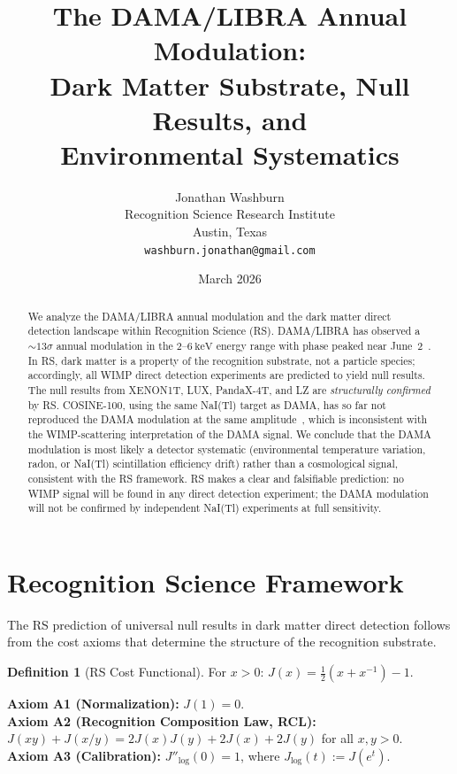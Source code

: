 \documentclass[12pt,a4paper]{article}
\title{The DAMA/LIBRA Annual Modulation:\\
Dark Matter Substrate, Null Results, and\\
Environmental Systematics}
\author{Jonathan Washburn\\
Recognition Science Research Institute\\
Austin, Texas\\
\texttt{washburn.jonathan@gmail.com}}
\date{March 2026}
\theoremstyle{definition}
\newtheorem{definition}[theorem]{Definition}
\theoremstyle{remark}
\begin{document}
\maketitle

\begin{abstract}
We analyze the DAMA/LIBRA annual modulation and the dark matter direct
detection landscape within Recognition Science (RS).  DAMA/LIBRA has
observed a $\sim 13\sigma$ annual modulation in the $2$--$6~\mathrm{keV}$
energy range with phase peaked near June~2~\cite{DAMA2018}.  In RS,
dark matter is a property of the recognition substrate, not a particle
species; accordingly, all WIMP direct detection experiments are
predicted to yield null results.  The null results from XENON1T, LUX,
PandaX-4T, and LZ are \emph{structurally confirmed} by RS.  COSINE-100,
using the same NaI(Tl) target as DAMA, has so far not reproduced the
DAMA modulation at the same amplitude~\cite{COSINE2021}, which is
inconsistent with the WIMP-scattering interpretation of the DAMA signal.
We conclude that the DAMA modulation is most likely a detector
systematic (environmental temperature variation, radon, or NaI(Tl)
scintillation efficiency drift) rather than a cosmological signal,
consistent with the RS framework.  RS makes a clear and falsifiable
prediction: no WIMP signal will be found in any direct detection
experiment; the DAMA modulation will not be confirmed by independent
NaI(Tl) experiments at full sensitivity.
\end{abstract}

\section{Recognition Science Framework}
\label{sec:framework}

The RS prediction of universal null results in dark matter direct
detection follows from the cost axioms that determine the structure
of the recognition substrate.

\begin{definition}[RS Cost Functional]
For $x > 0$: $J(x) = \tfrac{1}{2}(x + x^{-1}) - 1$.
\end{definition}

\noindent\textbf{Axiom A1 (Normalization):} $J(1) = 0$.\\
\textbf{Axiom A2 (Recognition Composition Law, RCL):}
$J(xy)+J(x/y)=2J(x)J(y)+2J(x)+2J(y)$ for all $x,y>0$.\\
\textbf{Axiom A3 (Calibration):} $J''_{\log}(0) = 1$, where
$J_{\log}(t) := J(e^t)$.
\end{document}

